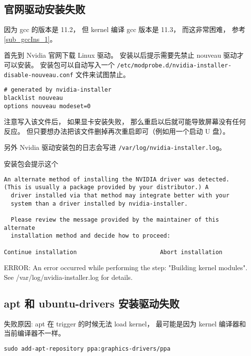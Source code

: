 
\subsection{官网驱动安装失败}

因为 gcc 的版本是 11.2， 但 kernel 编译 gcc 版本是 11.3， 而这非常困难， 参考\autoref{sub_gccIns_1}。

首先到 Nvidia 官网下载 Linux 驱动。 安装以后提示需要先禁止 nouveau 驱动才可以安装。 安装包可以自动写入一个 \verb`/etc/modprobe.d/nvidia-installer-disable-nouveau.conf` 文件来试图禁止。
\begin{lstlisting}[language=none,caption=nvidia-installer-disable-nouveau.conf]
# generated by nvidia-installer
blacklist nouveau
options nouveau modeset=0
\end{lstlisting}

注意写入该文件后， 如果显卡安装失败， 那么重启以后就可能导致屏幕没有任何反应。 但只要想办法把该文件删掉再次重启即可（例如用一个启动 U 盘）。

另外 Nvidia 驱动安装包的日志会写进 \verb`/var/log/nvidia-installer.log`。

安装包会提示这个
\begin{lstlisting}[language=none]
An alternate method of installing the NVIDIA driver was detected.
(This is usually a package provided by your distributor.) A      
  driver installed via that method may integrate better with your
  system than a driver installed by nvidia-installer.

  Please review the message provided by the maintainer of this alternate
  installation method and decide how to proceed:

Continue installation                        Abort installation 
\end{lstlisting}

ERROR: An error occurred while performing the step: "Building kernel modules". See /var/log/nvidia-installer.log for details.      

\subsection{apt 和 ubuntu-drivers 安装驱动失败}

失败原因: apt 在 trigger 的时候无法 load kernel， 最可能是因为 kernel 编译器和当前编译器不一样。

\verb`sudo add-apt-repository ppa:graphics-drivers/ppa`

